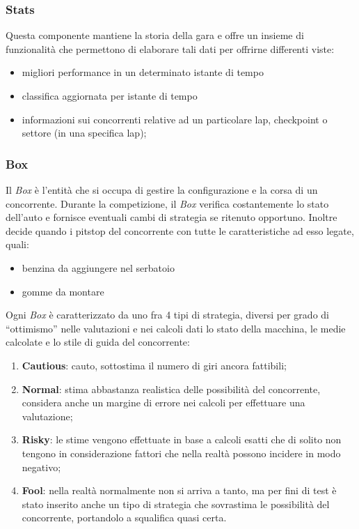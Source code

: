 \subsubsection{Stats}
Questa componente mantiene la storia della gara e offre un insieme di funzionalit\`{a} che permettono di elaborare tali dati per offrirne differenti viste:
	\begin{itemize}
		\item migliori performance in un determinato istante di tempo
		\item classifica aggiornata per istante di tempo
		\item informazioni sui concorrenti relative ad un particolare lap, checkpoint o settore (in una specifica lap);
	\end{itemize}
\subsubsection{Box}
Il \emph{Box} \`{e} l'entit\`{a} che si occupa di gestire la configurazione e la corsa di un concorrente. Durante la competizione, il \emph{Box} verifica costantemente
lo stato dell'auto e fornisce eventuali cambi di strategia se ritenuto opportuno. Inoltre decide quando i pitstop del concorrente con tutte le caratteristiche 
ad esso legate, quali:
	\begin{itemize}
		\item benzina da aggiungere nel serbatoio
		\item gomme da montare
	\end{itemize}
Ogni \emph{Box} \`{e} caratterizzato da uno fra 4 tipi di strategia, diversi per grado di ``ottimismo'' nelle valutazioni e nei calcoli dati lo stato della 
macchina, le medie calcolate e lo stile di guida del concorrente:
	\begin{enumerate}
		\item \textbf{Cautious}: cauto, sottostima il numero di giri ancora fattibili;
		\item \textbf{Normal}: stima abbastanza realistica delle possibilit\`{a} del concorrente, considera anche un margine di errore nei calcoli
			per effettuare una valutazione;
		\item \textbf{Risky}: le stime vengono effettuate in base a calcoli esatti che di solito non tengono in considerazione fattori che nella
			realt\`{a} possono incidere in modo negativo;
		\item \textbf{Fool}: nella realt\`{a} normalmente non si arriva a tanto, ma per fini di test \`{e} stato inserito anche un tipo di strategia
			che sovrastima le possibilit\`{a} del concorrente, portandolo a squalifica quasi certa.
	\end{enumerate}
